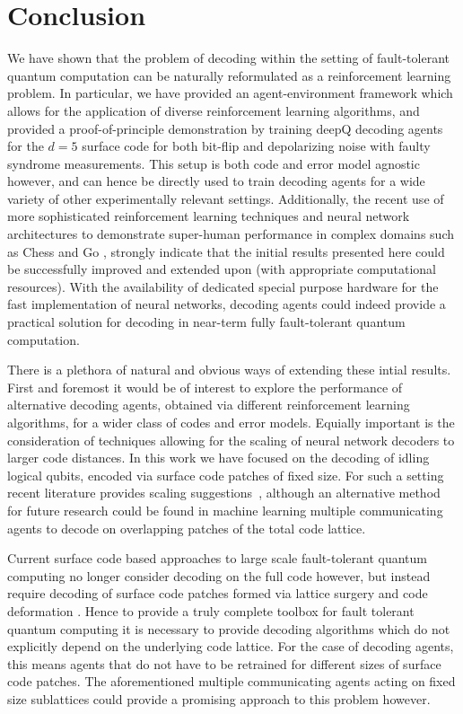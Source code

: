 \documentclass[twocolumn,preprintnumbers,amsmath,amssymb,notitlepage,nofootinbib,longbibliography,superscriptaddress,aps,pra,10pt]{revtex4-1}
\begin{document}
\section{Conclusion}\label{s:conclusions}

	We have shown that the problem of decoding within the setting of fault-tolerant quantum computation can be naturally reformulated as a reinforcement learning problem.
	In particular, we have provided an agent-environment framework which allows for the application of diverse reinforcement learning algorithms, and provided a proof-of-principle demonstration by training
	deepQ decoding agents for the $d=5$ surface code for both bit-flip and depolarizing noise with faulty syndrome measurements.
	This setup is both code and error model agnostic however, and can hence be directly used to train decoding agents for a wide variety of other experimentally relevant settings.
	Additionally, the recent use of more sophisticated reinforcement learning techniques and neural network architectures to demonstrate super-human performance in complex domains such as
	Chess and Go \cite{RLSilver17b,RLsilver2017mastering,RLSilver2016}, strongly indicate that the initial results presented here could be successfully improved and extended upon (with appropriate computational
	resources). With the availability of dedicated special purpose hardware for the fast implementation of neural networks, decoding agents could indeed provide a practical solution for decoding in near-term fully
	fault-tolerant quantum computation.

	There is a plethora of natural and obvious ways of extending these intial results.
	First and foremost it would be of interest to explore the performance of alternative decoding agents, obtained via different reinforcement learning algorithms, for a wider class of codes and error models.
	Equially important is the consideration of techniques allowing for the scaling of neural network decoders to larger code distances.
	In this work we have focused on the decoding of idling logical qubits, encoded via surface code patches of fixed size.
	For such a setting recent literature provides scaling suggestions~\cite{Ni18}, although an alternative method for future research could be found in machine learning multiple
	communicating agents to decode on overlapping patches of the total code lattice.

	Current surface code based approaches to large scale fault-tolerant quantum computing no longer consider decoding on the full code however,
	but instead require decoding of surface code patches formed via lattice surgery and code deformation \cite{Litinski18b,Fowler18}.
	Hence to provide a truly complete toolbox for fault tolerant quantum computing it is necessary to provide decoding algorithms which do not explicitly depend on the underlying code lattice.
	For the case of decoding agents, this means agents that do not have to be retrained for different sizes of surface code patches.
	The aforementioned multiple communicating agents acting on fixed size sublattices could provide a promising approach to this problem however.
\end{document}
